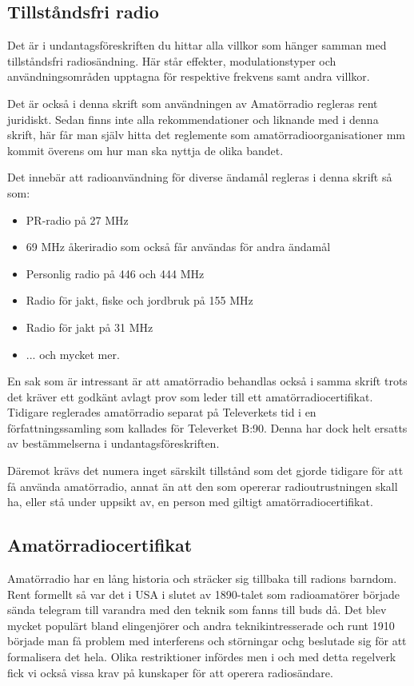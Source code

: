 
\subsection{Tillståndsfri radio}

Det är i undantagsföreskriften du hittar alla villkor som hänger samman med
tillståndsfri radiosändning. Här står effekter, modulationstyper och
användningsområden upptagna för respektive frekvens samt andra villkor.

Det är också i denna skrift som användningen av Amatörradio regleras rent
juridiskt. Sedan finns inte alla rekommendationer och liknande med i denna
skrift, här får man själv hitta det reglemente som amatörradioorganisationer mm
kommit överens om hur man ska nyttja de olika bandet.

Det innebär att radioanvändning för diverse ändamål regleras i denna skrift så
som:

\begin{itemize}
 \item PR-radio på 27 MHz
 \item 69 MHz åkeriradio som också får användas för andra ändamål
 \item Personlig radio på 446 och 444 MHz
 \item Radio för jakt, fiske och jordbruk på 155 MHz
 \item Radio för jakt på 31 MHz
 \item ... och mycket mer.
\end{itemize}

En sak som är intressant är att amatörradio behandlas också i samma skrift trots
det kräver ett godkänt avlagt prov som leder till ett amatörradiocertifikat.
Tidigare reglerades amatörradio separat på Televerkets tid i en
författningssamling som kallades för Televerket B:90. Denna har dock helt
ersatts av bestämmelserna i undantagsföreskriften.

Däremot krävs det numera inget särskilt tillstånd som det gjorde tidigare för
att få använda amatörradio, annat än att den som opererar radioutrustningen
skall ha, eller stå under uppsikt av, en person med giltigt
amatörradiocertifikat.

\subsection{Amatörradiocertifikat}

Amatörradio har en lång historia och sträcker sig tillbaka till
radions barndom. Rent formellt så var det i USA i slutet av 1890-talet
som radioamatörer började sända telegram till varandra med den teknik
som fanns till buds då. Det blev mycket populärt bland elingenjörer
och andra teknikintresserade och runt 1910 började man få problem med
interferens och störningar ochg beslutade sig för att formalisera det
hela. Olika restriktioner infördes men i och med detta regelverk fick
vi också vissa krav på kunskaper för att operera radiosändare.

